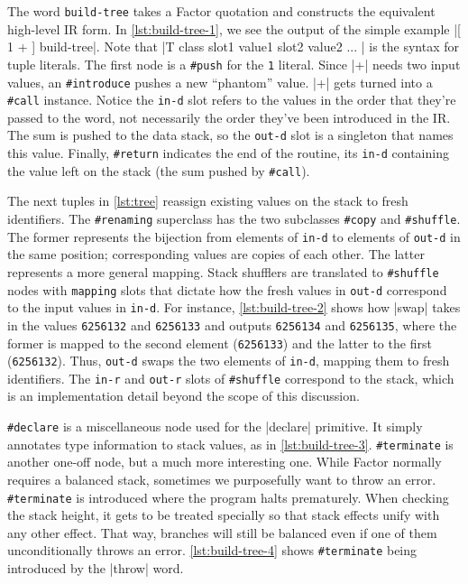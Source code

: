 
The word \Verb|build-tree| takes a Factor quotation and constructs the
equivalent high-level \gls{IR} form.  In \cref{lst:build-tree-1}, we see the
output of the simple example
%
\factor|[ 1 + ] build-tree|.
%
Note that
%
\factor|T{ class { slot1 value1 } { slot2 value2 } ... }|
%
is the syntax for tuple literals.  The first node is a \Verb|#push| for the
\Verb|1| literal.  Since \factor|+| needs two input values, an
\Verb|#introduce| pushes a new ``phantom'' value.  \factor|+| gets turned
into a \Verb|#call| instance.  Notice the \Verb|in-d| slot refers to the
values in the order that they're passed to the word, not necessarily the order
they've been introduced in the \gls{IR}.  The sum is pushed to the data stack,
so the \Verb|out-d| slot is a singleton that names this value.  Finally,
\Verb|#return| indicates the end of the routine, its \Verb|in-d| containing
the value left on the stack (the sum pushed by \Verb|#call|).


The next tuples in \cref{lst:tree} reassign existing values on the stack to
fresh identifiers.  The \Verb|#renaming| superclass has the two subclasses
\Verb|#copy| and \Verb|#shuffle|.  The former represents the bijection from
elements of \Verb|in-d| to elements of \Verb|out-d| in the same position;
corresponding values are copies of each other.  The latter represents a more
general mapping.  Stack shufflers are translated to \Verb|#shuffle| nodes
with \Verb|mapping| slots that dictate how the fresh values in \Verb|out-d|
correspond to the input values in \Verb|in-d|.  For instance,
\cref{lst:build-tree-2} shows how \factor|swap| takes in the values
\Verb|6256132| and \Verb|6256133| and outputs \Verb|6256134| and
\Verb|6256135|, where the former is mapped to the second element
(\Verb|6256133|) and the latter to the first (\Verb|6256132|).  Thus,
\Verb|out-d| swaps the two elements of \Verb|in-d|, mapping them to fresh
identifiers.  The \Verb|in-r| and \Verb|out-r| slots of \Verb|#shuffle|
correspond to the  stack, which is an implementation detail beyond
the scope of this discussion.


\Verb|#declare| is a miscellaneous node used for the \factor|declare|
primitive.  It simply annotates type information to stack values, as in
\cref{lst:build-tree-3}.  \Verb|#terminate| is another one-off node, but a
much more interesting one.  While Factor normally requires a balanced stack,
sometimes we purposefully want to throw an error.  \Verb|#terminate| is
introduced where the program halts prematurely.  When checking the stack
height, it gets to be treated specially so that  stack effects
unify with any other effect.  That way, branches will still be balanced even if
one of them unconditionally throws an error.  \cref{lst:build-tree-4} shows
\Verb|#terminate| being introduced by the \factor|throw| word.

